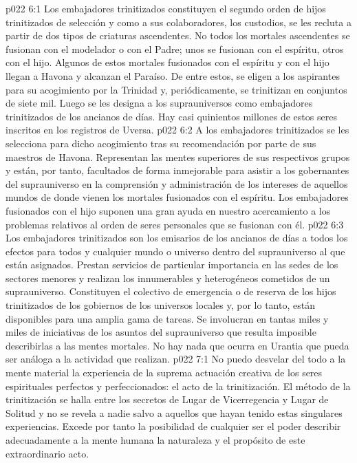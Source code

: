 \vs p022 6:1 Los embajadores trinitizados constituyen el segundo orden de hijos trinitizados de selección y como a sus colaboradores, los custodios, se les recluta a partir de dos tipos de criaturas ascendentes. No todos los mortales ascendentes se fusionan con el modelador o con el Padre; unos se fusionan con el espíritu, otros con el hijo. Algunos de estos mortales fusionados con el espíritu y con el hijo llegan a Havona y alcanzan el Paraíso. De entre estos, se eligen a los aspirantes para su acogimiento por la Trinidad y, periódicamente, se trinitizan en conjuntos de siete mil. Luego se les designa a los suprauniversos como embajadores trinitizados de los ancianos de días. Hay casi quinientos millones de estos seres inscritos en los registros de Uversa.
\vs p022 6:2 A los embajadores trinitizados se les selecciona para dicho acogimiento tras su recomendación por parte de sus maestros de Havona. Representan las mentes superiores de sus respectivos grupos y están, por tanto, facultados de forma inmejorable para asistir a los gobernantes del suprauniverso en la comprensión y administración de los intereses de aquellos mundos de donde vienen los mortales fusionados con el espíritu. Los embajadores fusionados con el hijo suponen una gran ayuda en nuestro acercamiento a los problemas relativos al orden de seres personales que se fusionan con él.
\vs p022 6:3 Los embajadores trinitizados son los emisarios de los ancianos de días a todos los efectos para todos y cualquier mundo o universo dentro del suprauniverso al que están asignados. Prestan servicios de particular importancia en las sedes de los sectores menores y realizan los innumerables y heterogéneos cometidos de un suprauniverso. Constituyen el colectivo de emergencia o de reserva de los hijos trinitizados de los gobiernos de los universos locales y, por lo tanto, están disponibles para una amplia gama de tareas. Se involucran en tantas miles y miles de iniciativas de los asuntos del suprauniverso que resulta imposible describirlas a las mentes mortales. No hay nada que ocurra en Urantia que pueda ser análoga a la actividad que realizan.
\vs p022 7:1 No puedo desvelar del todo a la mente material la experiencia de la suprema actuación creativa de los seres espirituales perfectos y perfeccionados: el acto de la trinitización. El método de la trinitización se halla entre los secretos de Lugar de Vicerregencia y Lugar de Solitud y no se revela a nadie salvo a aquellos que hayan tenido estas singulares experiencias. Excede por tanto la posibilidad de cualquier ser el poder describir adecuadamente a la mente humana la naturaleza y el propósito de este extraordinario acto.
